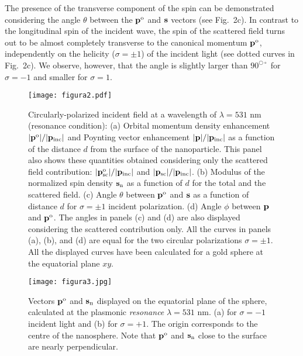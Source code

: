 \documentclass[journal=apchd5,manuscript=article]{achemso}
\begin{document}
The presence of the transverse component of the spin can be demonstrated considering the angle $\theta$ between the ${\bf p}^{\rm o}$ and $\bf s$ vectors (see Fig.~2c). In contrast to the longitudinal spin of the incident wave, the spin of the scattered field turns out to be almost completely transverse to the canonical momentum ${\bf p}^{\rm o}$, independently on the helicity ($\sigma=\pm 1$) of the incident light (see dotted curves in Fig.~2c). We observe, however, that the angle is slightly larger than $90^{○\circ} $ for $\sigma= -1$ and smaller for $\sigma=1$. 

\begin{figure}[!ht]
	\centering
	\texttt{[image: figura2.pdf]}
	\caption{Circularly-polarized incident field at a wavelength of $\lambda=531$ nm (resonance condition): (a) Orbital momentum density enhancement $|\bf p^{\rm o}|/|\bf p_{\rm inc}|$ and Poynting vector enhancement $|\bf p|/|\bf p_{\rm inc}|$  as a function of the distance $d$ from the surface of the nanoparticle. This panel also shows these quantities obtained considering only the scattered field contribution: $|\bf p^{\rm o}_{\rm sc}|/|\bf p_{\rm inc}|$ and  $|\bf p_{\rm sc}|/|\bf p_{\rm inc}|$. (b) Modulus of the normalized spin density $\bf s_{\rm n}$ as a function of $d$ for the total and the scattered field. (c) Angle $\theta$ between $\bf p^{\rm o}$ and $\bf s$ as a function of distance $d$ for $\sigma = \pm 1$ incident polarization. (d) Angle $\phi$ between ${\bf p}$ and $\bf p^{\rm o}$.  The angles in panels (c) and (d) are also displayed considering the scattered contribution only. All the curves in  panels (a), (b), and (d) are equal for the two circular polarizations $\sigma = \pm 1$.
	All the displayed curves have been calculated for a gold sphere at the equatorial plane $xy$. 
		\label{fig:2}}
\end{figure}
\newpage
\begin{figure}[!ht]
	\centering
	\texttt{[image: figura3.jpg]}
	\caption{Vectors $\bf p^{\rm o}$ and ${\bf s}_{\rm n}$ displayed on the equatorial plane of the sphere, calculated at the plasmonic \textit{resonance} $\lambda = 531$ nm. (a) for  $\sigma = -1$ incident light  and (b) for  $\sigma = +1$. The origin corresponds to the centre of the nanosphere. Note that $\bf p^{\rm o}$ and ${\bf s}_{\rm n}$ close to the surface are nearly perpendicular.
		\label{fig:3}}
\end{figure}
\newpage
\end{document}
